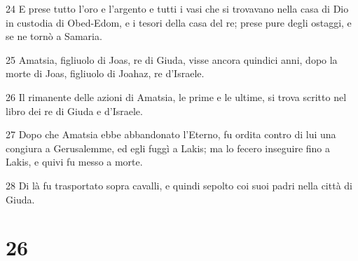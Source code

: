 \par 24 E prese tutto l'oro e l'argento e tutti i vasi che si trovavano nella casa di Dio in custodia di Obed-Edom, e i tesori della casa del re; prese pure degli ostaggi, e se ne tornò a Samaria.
\par 25 Amatsia, figliuolo di Joas, re di Giuda, visse ancora quindici anni, dopo la morte di Joas, figliuolo di Joahaz, re d'Israele.
\par 26 Il rimanente delle azioni di Amatsia, le prime e le ultime, si trova scritto nel libro dei re di Giuda e d'Israele.
\par 27 Dopo che Amatsia ebbe abbandonato l'Eterno, fu ordita contro di lui una congiura a Gerusalemme, ed egli fuggì a Lakis; ma lo fecero inseguire fino a Lakis, e quivi fu messo a morte.
\par 28 Di là fu trasportato sopra cavalli, e quindi sepolto coi suoi padri nella città di Giuda.

\chapter{26}

